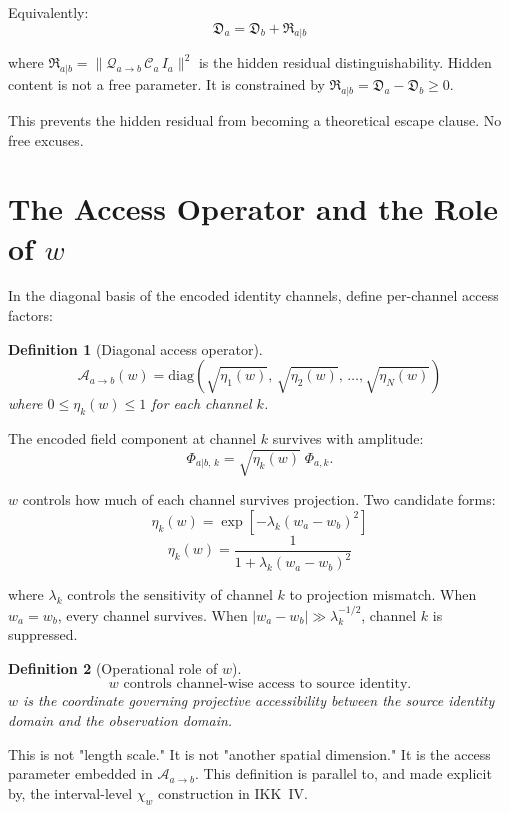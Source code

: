 \documentclass[11pt,a4paper,oneside]{article}
\newtheorem{definition}{Definition}[section]
\newcommand{\Ia}{I_a}
\newcommand{\Ca}{\mathcal{C}_a}
\newcommand{\Aab}{\mathcal{A}_{a\to b}}
\newcommand{\Qab}{\mathcal{Q}_{a\to b}}
\newcommand{\Da}{\mathfrak{D}_a}
\newcommand{\Db}{\mathfrak{D}_b}
\newcommand{\Rhid}{\mathfrak{R}_{a|b}}
\newcommand{\etak}{\eta_k(w)}
\newcommand{\wa}{w_a}
\newcommand{\wb}{w_b}
\newcommand{\wcoord}{w}
\begin{document}
Equivalently:
\[
\boxed{\Da = \Db + \Rhid}
\]

where $\Rhid = \|\Qab\,\Ca\,\Ia\|^2$ is the hidden residual distinguishability. Hidden content is not a free parameter. It is constrained by $\Rhid = \Da - \Db \geq 0$.

This prevents the hidden residual from becoming a theoretical escape clause. No free excuses.

\section{The Access Operator and the Role of $w$}

In the diagonal basis of the encoded identity channels, define per-channel access factors:

\begin{definition}[Diagonal access operator]
\[
\Aab(w) = \mathrm{diag}\!\left(\sqrt{\eta_1(w)},\,\sqrt{\eta_2(w)},\,\ldots,\sqrt{\eta_N(w)}\right)
\]
where $0 \leq \eta_k(w) \leq 1$ for each channel $k$.
\end{definition}

The encoded field component at channel $k$ survives with amplitude:
\[
\Phi_{a|b,\,k} = \sqrt{\etak}\;\Phi_{a,k}.
\]

$\wcoord$ controls how much of each channel survives projection. Two candidate forms:
\[
\eta_k(w) = \exp\!\left[-\lambda_k(\wa - \wb)^2\right]
\]
\[
\eta_k(w) = \frac{1}{1 + \lambda_k(\wa - \wb)^2}
\]

where $\lambda_k$ controls the sensitivity of channel $k$ to projection mismatch. When $\wa = \wb$, every channel survives. When $|\wa - \wb| \gg \lambda_k^{-1/2}$, channel $k$ is suppressed.

\begin{definition}[Operational role of $w$]
\[
\boxed{w \text{ controls channel-wise access to source identity.}}
\]
$w$ is the coordinate governing projective accessibility between the source identity domain and the observation domain.
\end{definition}

This is not "length scale." It is not "another spatial dimension." It is the access parameter embedded in $\Aab$. This definition is parallel to, and made explicit by, the interval-level $\chi_w$ construction in IKK~IV.

\end{document}
